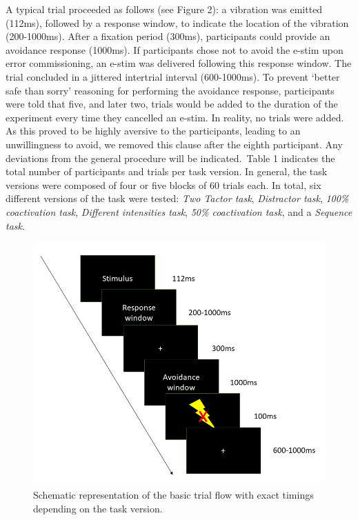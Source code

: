 \documentclass[twocolumn, serif, authordate, review]{jote-article}
\begin{document}
A typical trial proceeded as follows (see Figure 2): a vibration was emitted (112ms), followed by a response window, to indicate the location of the vibration (200-1000ms). After a fixation period (300ms), participants could provide an avoidance response (1000ms). If participants chose not to avoid the e-stim upon error commissioning, an e-stim was delivered following this response window. The trial concluded in a jittered intertrial interval (600-1000ms). To prevent `better safe than sorry' reasoning for performing the avoidance response, participants were told that five, and later two, trials would be added to the duration of the experiment every time they cancelled an e-stim. In reality, no trials were added. As this proved to be highly aversive to the participants, leading to an unwillingness to avoid, we removed this clause after the eighth participant. Any deviations from the general procedure will be indicated.~Table 1 indicates the total number of participants and trials per task version. In general, the task versions were composed of four or five blocks of 60 trials each. In total, six different versions of the task were tested: \textit{Two Tactor task}, \textit{Distractor task}, \textit{100\% coactivation task}, \textit{Different intensities task}, \textit{50\% coactivation task}, and a \textit{Sequence task}.

\begin{figure}
    \centering
    \includegraphics[width=\columnwidth]{articles/empirical/traxler/Figure 2_Trial and Error (-Related Negativity) (5).png}
    \caption{Schematic representation of the basic trial flow with exact timings depending on the task version.}
    \label{fig:my_label}
\end{figure}
\end{document}
